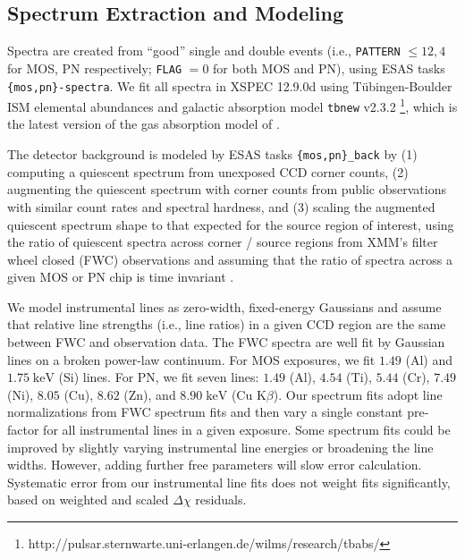 \documentclass[preprint2,tighten,trackchanges]{aastex6}
\newcommand*{\mt}{\mathrm}
\newcommand*{\unit}[1]{\;\mt{#1}}  %
\begin{document}
\subsection{Spectrum Extraction and Modeling}

Spectra are created from ``good'' single and double events (i.e.,
\texttt{PATTERN} $\leq 12,4$ for MOS, PN respectively; \texttt{FLAG} $= 0$ for
both MOS and PN), using ESAS tasks \texttt{\{mos,pn\}-spectra}.
We fit all spectra in XSPEC 12.9.0d \citep{arnaud1996}
using T{\"u}bingen-Boulder ISM elemental abundances \citep{wilms2000}
and galactic absorption model \texttt{tbnew} v2.3.2
\footnote{http://pulsar.sternwarte.uni-erlangen.de/wilms/research/tbabs/},
which is the latest version of the gas absorption model of \citet{wilms2000}.

The detector background is modeled by ESAS tasks \texttt{\{mos,pn\}\_back}
by (1) computing a quiescent spectrum from unexposed CCD corner counts,
(2) augmenting the quiescent spectrum with corner counts from public
observations with similar count rates and spectral hardness, and (3) scaling
the augmented quiescent spectrum shape to that expected for the source region
of interest, using the ratio of quiescent spectra across corner / source
regions from XMM's filter wheel closed (FWC) observations and assuming that the
ratio of spectra across a given MOS or PN chip is time invariant
\citep[Sec. 3.4]{kuntz2008}.

We model instrumental lines as zero-width, fixed-energy Gaussians and assume
that relative line strengths (i.e., line ratios) in a given CCD region are the
same between FWC and observation data.
The FWC spectra are well fit by Gaussian lines on a broken power-law continuum.
For MOS exposures, we fit $1.49$ (Al) and $1.75 \unit{keV}$ (Si) lines.
For PN, we fit seven lines: $1.49$ (Al), $4.54$ (Ti), $5.44$ (Cr), $7.49$ (Ni),
$8.05$ (Cu), $8.62$ (Zn), and $8.90 \unit{keV}$ (Cu K$\beta$).
Our spectrum fits adopt line normalizations from FWC spectrum fits and then
vary a single constant pre-factor for all instrumental lines in a given
exposure.
Some spectrum fits could be improved by slightly varying instrumental line
energies or broadening the line widths.
However, adding further free parameters will slow error calculation.
Systematic error from our instrumental line fits does not weight fits
significantly, based on weighted and scaled $\Delta \chi$ residuals.
\end{document}
